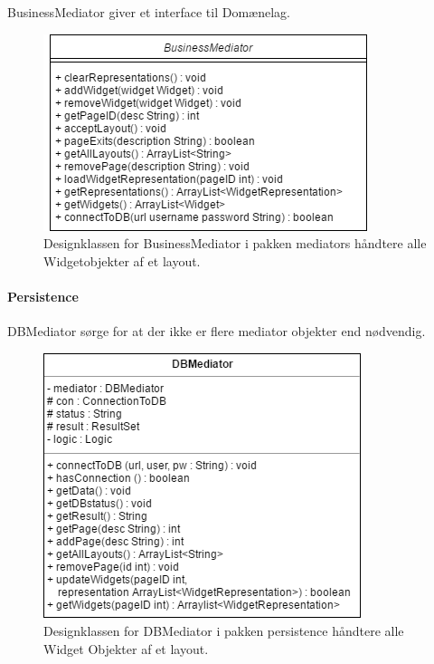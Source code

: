 BusinessMediator giver et interface til Domænelag.
  
\begin{figure}[H]
      \includegraphics[width=\linewidth]{elaborationsdokumentet/figurer/design/designklasser/Designklasse-BusinessMediator.png}
      \caption{Designklassen for BusinessMediator i pakken mediators håndtere alle Widgetobjekter af et layout.}
      \label{Designklasse-BusinessMediator}
  \end{figure}

\paragraph{Persistence}

DBMediator sørge for at der ikke er flere mediator objekter end nødvendig.
      \begin{figure}[H]
      \includegraphics[width=\linewidth]{elaborationsdokumentet/figurer/design/designklasser/Designklasse-DBMediator.png}
      \caption{Designklassen for DBMediator i pakken persistence håndtere alle Widget Objekter af et layout.}
      \label{Designklasse-DBMediator}
  \end{figure}
  
